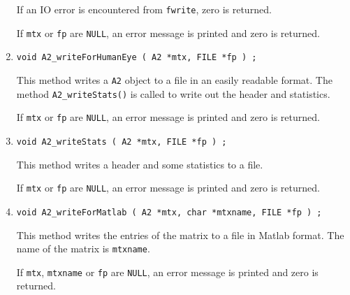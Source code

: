 \begin{enumerate}
If an IO error is encountered from {\tt fwrite}, zero is returned.
\par {}
If {\tt mtx} or {\tt fp} are {\tt NULL},
an error message is printed and zero is returned.
\item
\begin{verbatim}
void A2_writeForHumanEye ( A2 *mtx, FILE *fp ) ;
\end{verbatim}
\par
This method writes a {\tt A2} object to a file in an easily
readable format.
The method {\tt A2\_writeStats()} is called to write out the
header and statistics. 
\par {}
If {\tt mtx} or {\tt fp} are {\tt NULL},
an error message is printed and zero is returned.
\item
\begin{verbatim}
void A2_writeStats ( A2 *mtx, FILE *fp ) ;
\end{verbatim}
\par
This method writes a header and some statistics to a file.
\par {}
If {\tt mtx} or {\tt fp} are {\tt NULL},
an error message is printed and zero is returned.
\item
\begin{verbatim}
void A2_writeForMatlab ( A2 *mtx, char *mtxname, FILE *fp ) ;
\end{verbatim}
\par
This method writes the entries of the matrix to a file
in Matlab format.
The name of the matrix is {\tt mtxname}.
\par {}
If {\tt mtx}, {\tt mtxname} or {\tt fp} are {\tt NULL},
an error message is printed and zero is returned.
\end{enumerate}

